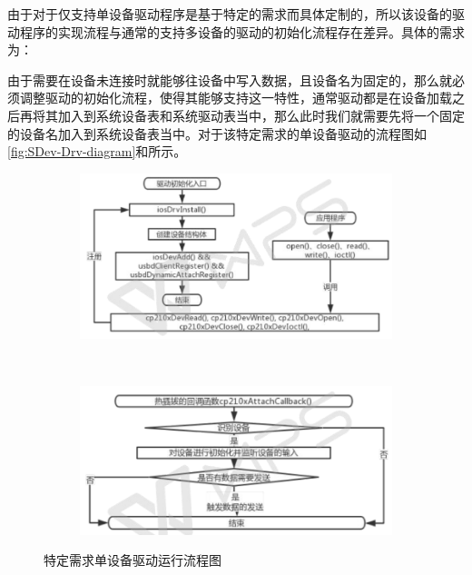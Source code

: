 	由于对于仅支持单设备驱动程序是基于特定的需求而具体定制的，所以该设备的驱动程序的实现流程与通常的支持多设备的驱动的初始化流程存在差异。具体的需求为：

	由于需要在设备未连接时就能够往设备中写入数据，且设备名为固定的，那么就必须调整驱动的初始化流程，使得其能够支持这一特性，通常驱动都是在设备加载之后再将其加入到系统设备表和系统驱动表当中，那么此时我们就需要先将一个固定的设备名加入到系统设备表当中。对于该特定需求的单设备驱动的流程图如\autoref{fig:SDev-Drv-diagram}和所示。
\begin{figure}[h]
\centering
  \begin{subfigure}[b]{1.0\textwidth}
  \includegraphics[width=\textwidth]{./graphics/SDev-Drv-Diagram-a.pdf}
  \caption{}\label{fig:SDevice-Driver-diagram-a}
  \end{subfigure}
  ~
  \begin{subfigure}[b]{1.0\textwidth}
  \includegraphics[width=\textwidth]{./graphics/SDev-Drv-Diagram-b.pdf}
  \caption{}\label{fig:SDevice-Driver-diagram-b}
  \end{subfigure}
\caption{特定需求单设备驱动运行流程图}\label{fig:SDev-Drv-diagram}
\end{figure}





